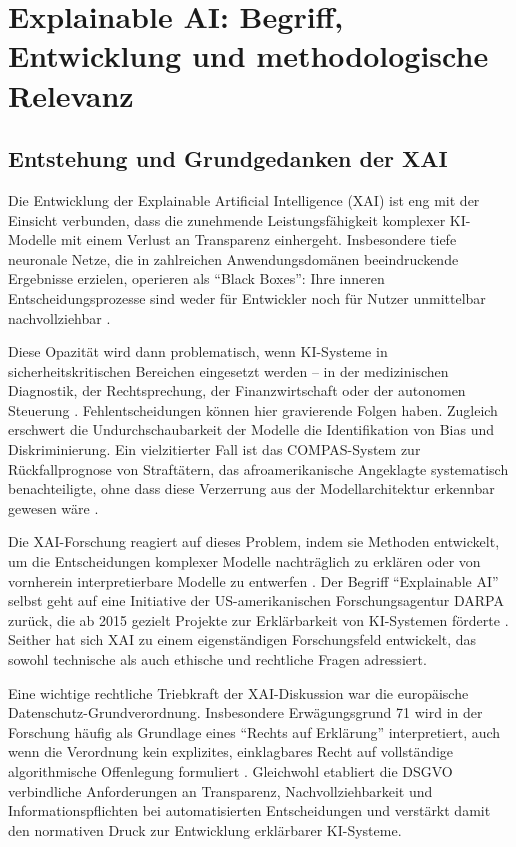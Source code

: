 \documentclass[
  12pt,
  a4paper,
  oneside,
  titlepage
]{article}
\begin{document}
\section{Explainable AI: Begriff, Entwicklung und methodologische Relevanz}

\subsection{Entstehung und Grundgedanken der XAI}

Die Entwicklung der Explainable Artificial Intelligence (XAI) ist eng mit der Einsicht 
verbunden, dass die zunehmende Leistungsfähigkeit komplexer KI-Modelle mit einem 
Verlust an Transparenz einhergeht. Insbesondere tiefe neuronale Netze, die in 
zahlreichen Anwendungsdomänen beeindruckende Ergebnisse erzielen, operieren als 
\enquote{Black Boxes}: Ihre inneren Entscheidungsprozesse sind weder für Entwickler 
noch für Nutzer unmittelbar nachvollziehbar \citep[ S.~2]{Samek2019}.

Diese Opazität wird dann problematisch, wenn KI-Systeme in sicherheitskritischen 
Bereichen eingesetzt werden – in der medizinischen Diagnostik, der Rechtsprechung, 
der Finanzwirtschaft oder der autonomen Steuerung \citep[ S.~80800]{Ortigossa2024}. 
Fehlentscheidungen können hier gravierende Folgen haben. Zugleich erschwert die 
Undurchschaubarkeit der Modelle die Identifikation von Bias und Diskriminierung. 
Ein vielzitierter Fall ist das COMPAS-System zur Rückfallprognose von Straftätern, 
das afroamerikanische Angeklagte systematisch benachteiligte, ohne dass diese 
Verzerrung aus der Modellarchitektur erkennbar gewesen wäre \citep[ S.~84]{BarredoArrieta2020}.

Die XAI-Forschung reagiert auf dieses Problem, indem sie Methoden entwickelt, um 
die Entscheidungen komplexer Modelle nachträglich zu erklären oder von vornherein 
interpretierbare Modelle zu entwerfen \citep{Mersha2024}. Der Begriff \enquote{Explainable AI} 
selbst geht auf eine Initiative der US-amerikanischen Forschungsagentur DARPA zurück, 
die ab 2015 gezielt Projekte zur Erklärbarkeit von KI-Systemen förderte 
\citep[ S.~86]{BarredoArrieta2020}. Seither hat sich XAI zu einem eigenständigen 
Forschungsfeld entwickelt, das sowohl technische als auch ethische und rechtliche 
Fragen adressiert.

Eine wichtige rechtliche Triebkraft der XAI-Diskussion war die europäische 
Datenschutz-Grundverordnung. Insbesondere Erwägungsgrund 71 wird in der Forschung 
häufig als Grundlage eines \enquote{Rechts auf Erklärung} interpretiert, auch wenn 
die Verordnung kein explizites, einklagbares Recht auf vollständige algorithmische 
Offenlegung formuliert \citep{Wachter2017}. Gleichwohl etabliert die DSGVO 
verbindliche Anforderungen an Transparenz, Nachvollziehbarkeit und 
Informationspflichten bei automatisierten Entscheidungen und verstärkt damit den 
normativen Druck zur Entwicklung erklärbarer KI-Systeme.
\end{document}
